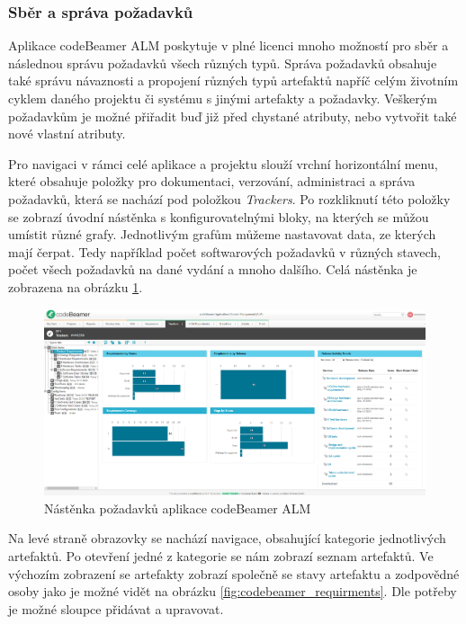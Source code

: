 \documentclass[czech,master,public,dept460,male,cpdeclaration,oneside]{diploma}
\begin{document}
\subsubsection{Sběr a správa požadavků}
Aplikace codeBeamer ALM poskytuje v plné licenci mnoho možností pro sběr a následnou správu požadavků všech různých typů. Správa požadavků obsahuje také správu návaznosti a propojení různých typů artefaktů napříč celým životním cyklem daného projektu či systému s jinými artefakty a požadavky. Veškerým požadavkům je možné přiřadit buď již před chystané atributy, nebo vytvořit také nové vlastní atributy. 

Pro navigaci v rámci celé aplikace a projektu slouží vrchní horizontální menu, které obsahuje položky pro dokumentaci, verzování, administraci a správa požadavků, která se nachází pod položkou \textit{Trackers}. Po rozkliknutí této položky se zobrazí úvodní nástěnka s konfigurovatelnými bloky, na kterých se můžou umístit různé grafy. Jednotlivým grafům můžeme nastavovat data, ze kterých mají čerpat. Tedy například počet softwarových požadavků v různých stavech, počet všech požadavků na dané vydání a mnoho dalšího. Celá nástěnka je zobrazena na obrázku \ref{fig:codebeamer_trackers}.

\begin{figure}[!ht]
    \centering
    \includegraphics[width=1\textwidth]{Diplomka/Figures/codebeamer_trackers.png}
    \caption{Nástěnka požadavků aplikace codeBeamer ALM}
    \label{fig:codebeamer_trackers}
\end{figure}

Na levé straně obrazovky se nachází navigace, obsahující kategorie jednotlivých artefaktů. Po otevření jedné z kategorie se nám zobrazí seznam artefaktů. Ve výchozím zobrazení se artefakty zobrazí společně se stavy artefaktu a zodpovědné osoby jako je možné vidět na obrázku \ref{fig:codebeamer_requirments}. Dle potřeby je možné sloupce přidávat a upravovat.
\end{document}
